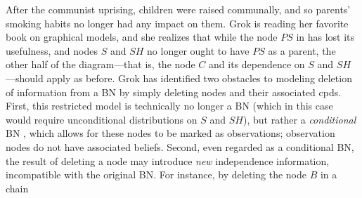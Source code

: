 \documentclass{article}
\theoremstyle{plain}
\theoremstyle{definition}
\newenvironment{example}
	{\pushQED{\qed}\renewcommand{\qedsymbol}{$\triangle$}\examplex}
	{\popQED\endexamplex%
}
\theoremstyle{remark}
\numberwithin{equation}{section}
\begin{document}
	\begin{example}[restriction]\label{ex:grok-ablate}
		After the communist uprising, children were raised communally, and so parents' smoking habits no longer had any impact on them. Grok is reading her favorite book on graphical models, and she realizes that while the node $\mathit{PS}$ in  has lost its usefulness, and nodes $S$ and $\mathit{SH}$ no longer ought to have $\mathit{PS}$ as a parent, the other half of the diagram---that is, the node $C$ and its dependence on $S$ and $\mathit{SH}$---should apply as before.
%		
		Grok has identified two obstacles to modeling deletion of information from a BN by simply deleting nodes and their associated cpds.
		First, this restricted model is technically no longer a
                BN (which in this case would require unconditional distributions on $S$ and $\mathit{SH}$), but rather a \emph{conditional} BN
                                \cite{KF09}%
				, which
				allows for these
                nodes to be marked as observations; observation nodes
                do not have associated beliefs.  
		Second, even regarded as a conditional BN, the result
                of deleting a node may introduce \emph{new}
                independence information, incompatible with the
                original BN. 
		For instance, by deleting the node $B$ in a chain 

\end{example}
\end{document}
